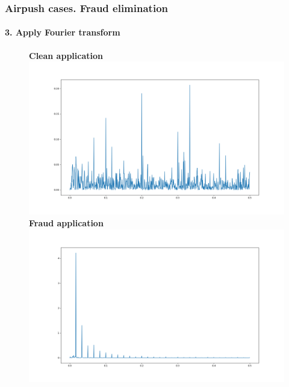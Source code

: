 \documentclass[intlimits, 9pt, unicode]{beamer}
\begin{document}
\begin{frame}
    \frametitle{Airpush cases. Fraud elimination}
    \framesubtitle{3. Apply Fourier transform}
    \begin{figure}
	\textbf{Clean application}
	\includegraphics[scale=0.10]{images/013_case_1}
	\textbf{Fraud application}
	\includegraphics[scale=0.10]{images/014_case_1}
     \end{figure}
\end{frame}
\end{document}
